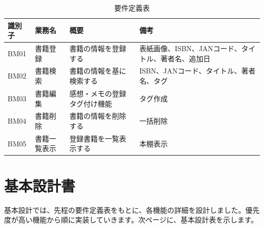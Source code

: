 \documentclass[a4paper, 11pt, titlepage]{jsarticle}
\begin{document}
\begin{table}[htbp]
  \centering
  \begin{tabular}{|l|l|>{\centering\arraybackslash}m{4cm}|>{\centering\arraybackslash}m{5cm}|}
    \hline
    \textbf{識別子} & \textbf{業務名} & \textbf{概要} & \textbf{備考} \\
    \hline\hline
    BM01 & 書籍登録 & 書籍の情報を登録する & 表紙画像、ISBN、JANコード、タイトル、著者名、追加日 \\
    \hline
    BM02 & 書籍検索 & 書籍の情報を基に検索する & ISBN、JANコード、タイトル、著者名、タグ \\
    \hline
    BM03 & 書籍編集 & 感想・メモの登録タグ付け機能 & タグ作成 \\
    \hline
    BM04 & 書籍削除 & 書籍の情報を削除する & 一括削除 \\
    \hline
    BM05 & 書籍一覧表示 & 登録書籍を一覧表示する & 本棚表示 \\
    \hline
  \end{tabular}
  \caption{要件定義表}
  \label{tab:requirements}
\end{table}

\section{基本設計書}
基本設計では、先程の要件定義表をもとに、各機能の詳細を設計しました。優先度が高い機能から順に実装していきます。次ページに、基本設計表を示します。
\end{document}
